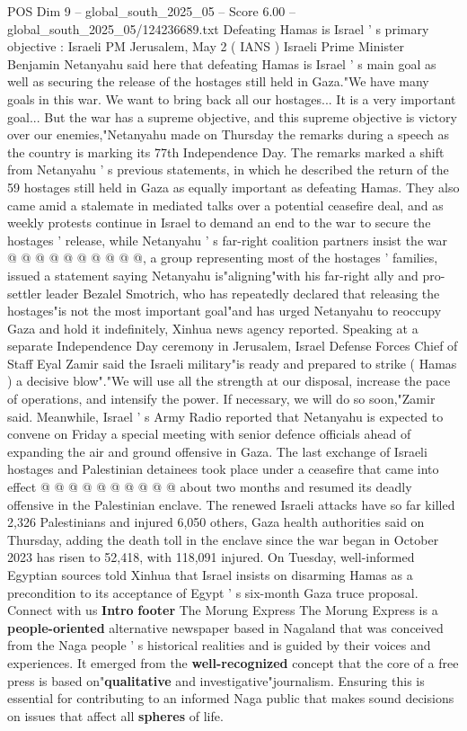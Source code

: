 \begin{textsample}{POS Dim 9 – global\_south\_2025\_05 – Score 6.00 – global\_south\_2025\_05/124236689.txt}  \label{ex:f9_pos_201}
Defeating Hamas is Israel ' s primary objective : Israeli PM Jerusalem, May 2 ( IANS ) Israeli Prime Minister Benjamin Netanyahu said here that defeating Hamas is Israel ' s main goal as well as securing the release of the hostages still held in Gaza."We have many goals in this war.
We want to bring back all our hostages...
It is a very important goal...
But the war has a supreme objective, and this supreme objective is victory over our enemies,"Netanyahu made on Thursday the remarks during a speech as the country is marking its 77th Independence Day.
The remarks marked a shift from Netanyahu ' s previous statements, in which he described the return of the 59 hostages still held in Gaza as equally important as defeating Hamas.
They also came amid a stalemate in mediated talks over a potential ceasefire deal, and as weekly protests continue in Israel to demand an end to the war to secure the hostages ' release, while Netanyahu ' s far-right coalition partners insist the war @ @ @ @ @ @ @ @ @ @, a group representing most of the hostages ' families, issued a statement saying Netanyahu is"aligning"with his far-right ally and pro-settler leader Bezalel Smotrich, who has repeatedly declared that releasing the hostages"is not the most important goal"and has urged Netanyahu to reoccupy Gaza and hold it indefinitely, Xinhua news agency reported.
Speaking at a separate Independence Day ceremony in Jerusalem, Israel Defense Forces Chief of Staff Eyal Zamir said the Israeli military"is ready and prepared to strike ( Hamas ) a decisive blow"."We will use all the strength at our disposal, increase the pace of operations, and intensify the power.
If necessary, we will do so soon,"Zamir said.
Meanwhile, Israel ' s Army Radio reported that Netanyahu is expected to convene on Friday a special meeting with senior defence officials ahead of expanding the air and ground offensive in Gaza.
The last exchange of Israeli hostages and Palestinian detainees took place under a ceasefire that came into effect @ @ @ @ @ @ @ @ @ @ about two months and resumed its deadly offensive in the Palestinian enclave.
The renewed Israeli attacks have so far killed 2,326 Palestinians and injured 6,050 others, Gaza health authorities said on Thursday, adding the death toll in the enclave since the war began in October 2023 has risen to 52,418, with 118,091 injured.
On Tuesday, well-informed Egyptian sources told Xinhua that Israel insists on disarming Hamas as a precondition to its acceptance of Egypt ' s six-month Gaza truce proposal.
Connect with us \textbf{Intro} \textbf{footer} The Morung Express The Morung Express is a \textbf{people-oriented} alternative newspaper based in Nagaland that was conceived from the Naga people ' s historical realities and is guided by their voices and experiences.
It emerged from the \textbf{well-recognized} concept that the core of a free press is based on"\textbf{qualitative} and investigative"journalism.
Ensuring this is essential for contributing to an informed Naga public that makes sound decisions on issues that affect all \textbf{spheres} of life.

\end{textsample}

